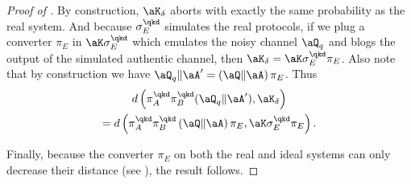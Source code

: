 \begin{proof}[Proof of ]
  By construction, $\aK_\delta$ aborts with exactly the same
  probability as the real system. And because $\sigma^{\qkd}_E$
  simulates the real protocols, if we plug a converter $\pi_E$ in
  $\aK\sigma^{\qkd}_E$ which emulates the noisy channel $\aQ_q$ and
  blogs the output of the simulated authentic channel, then
  $\aK_\delta = \aK\sigma^{\qkd}_E\pi_E$. Also note that by
  construction we have
  $\aQ_q \| \aA' = \left(\aQ \| \aA\right) \pi_E$. Thus
  \begin{multline*} d\left( \pi_A^{\qkd}\pi_B^{\qkd}(\aQ_q \| \aA')
      ,\aK_\delta\right) \\ = d\left( \pi_A^{\qkd}\pi_B^{\qkd}\left(\aQ
        \| \aA\right) \pi_E , \aK\sigma^{\qkd}_E\pi_E\right). \end{multline*}

  Finally, because the converter $\pi_E$ on both the real and ideal
  systems can only decrease their distance (see
  ), the result follows.
\end{proof}


